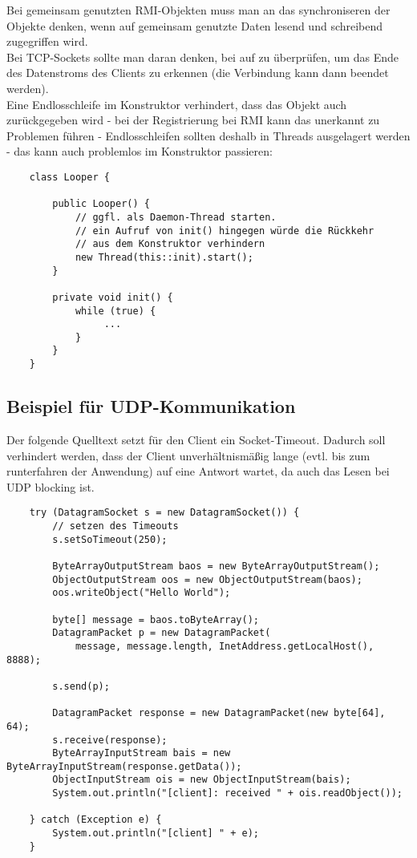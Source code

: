\noindent
Bei gemeinsam genutzten RMI-Objekten muss man an das synchroniseren der Objekte denken, wenn auf gemeinsam genutzte
Daten lesend und schreibend zugegriffen wird.\\

\noindent
Bei TCP-Sockets sollte man daran denken, bei  auf  zu überprüfen, um das Ende des Datenstroms des Clients zu erkennen (die Verbindung kann dann beendet werden).\\

\noindent
Eine Endlosschleife im Konstruktor verhindert, dass das Objekt auch zurückgegeben wird - bei der Registrierung bei RMI kann das unerkannt zu Problemen führen - Endlosschleifen sollten deshalb in Threads ausgelagert werden - das kann auch problemlos im Konstruktor passieren:

\begin{verbatim}
    class Looper {

        public Looper() {
            // ggfl. als Daemon-Thread starten.
            // ein Aufruf von init() hingegen würde die Rückkehr
            // aus dem Konstruktor verhindern
            new Thread(this::init).start();
        }

        private void init() {
            while (true) {
                 ...
            }
        }
    }
\end{verbatim}


\subsection*{Beispiel für UDP-Kommunikation}
Der folgende Quelltext setzt für den Client ein Socket-Timeout. Dadurch soll verhindert werden, dass der Client unverhältnismäßig lange (evtl. bis zum runterfahren der Anwendung) auf eine Antwort wartet, da auch das Lesen bei UDP blocking ist.

\begin{verbatim}
    try (DatagramSocket s = new DatagramSocket()) {
        // setzen des Timeouts
        s.setSoTimeout(250);

        ByteArrayOutputStream baos = new ByteArrayOutputStream();
        ObjectOutputStream oos = new ObjectOutputStream(baos);
        oos.writeObject("Hello World");

        byte[] message = baos.toByteArray();
        DatagramPacket p = new DatagramPacket(
            message, message.length, InetAddress.getLocalHost(), 8888);

        s.send(p);

        DatagramPacket response = new DatagramPacket(new byte[64], 64);
        s.receive(response);
        ByteArrayInputStream bais = new ByteArrayInputStream(response.getData());
        ObjectInputStream ois = new ObjectInputStream(bais);
        System.out.println("[client]: received " + ois.readObject());

    } catch (Exception e) {
        System.out.println("[client] " + e);
    }
\end{verbatim}

